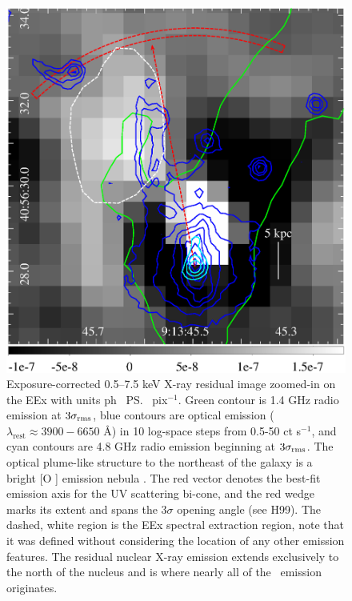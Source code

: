 \begin{figure}
  \begin{center}
    \begin{minipage}{\linewidth}
      \includegraphics*[width=\textwidth, trim=0mm 0mm 0mm 0mm, clip]{opt_xray.ps}
    \end{minipage}
    \caption{Exposure-corrected 0.5--7.5 keV X-ray residual image
      zoomed-in on the EEx with units ph
      \pcmsq\ \ps\ pix$^{-1}$. Green contour is 1.4 GHz radio emission
      at $3\sigma_{\rm{rms}}$, blue contours are optical emission
      ($\lambda_{\mathrm{rest}} \approx 3900-6650$ \AA) in 10
      log-space steps from 0.5-50 ct s$^{-1}$, and cyan contours are
      4.8 GHz radio emission beginning at $3\sigma_{\rm{rms}}$. The
      optical plume-like structure to the northeast of the galaxy is a
      bright [O ] emission nebula
      \citep[see][]{1996MNRAS.283.1003C}. The red vector denotes the
      best-fit emission axis for the UV scattering bi-cone, and the
      red wedge marks its extent and spans the $3\sigma$ opening angle
      (see H99). The dashed, white region is the EEx spectral
      extraction region, note that it was defined without considering
      the location of any other emission features. The residual
      nuclear X-ray emission extends exclusively to the north of the
      nucleus and is where nearly all of the \feka\ emission
      originates.}
    \label{fig:eex}
  \end{center}
\end{figure}

